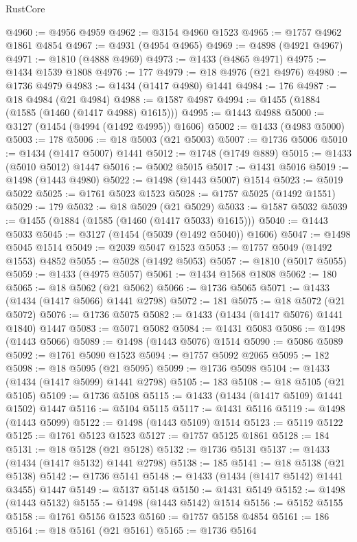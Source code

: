 \begin{lexlean}{RustCore}
\begin{coremodule}
@4960 := @4956 @4959
@4962 := @3154 @4960 @1523
@4965 := @1757 @4962 @1861 @4854
@4967 := @4931 (@4954 @4965)
@4969 := @4898 (@4921 @4967)
@4971 := @1810 (@4888 @4969)
@4973 := @1433 (@4865 @4971)
@4975 := @1434 @1539 @1808
@4976 := 177
@4979 := @18 @4976 (@21 @4976)
@4980 := @1736 @4979
@4983 := @1434 (@1417 @4980) @1441
@4984 := 176
@4987 := @18 @4984 (@21 @4984)
@4988 := @1587 @4987
@4994 := @1455 (@1884 (@1585 (@1460 (@1417 @4988) @1615)))
@4995 := @1443 @4988
@5000 := @3127 (@1454 (@4994 (@1492 @4995)) @1606)
@5002 := @1433 (@4983 @5000)
@5003 := 178
@5006 := @18 @5003 (@21 @5003)
@5007 := @1736 @5006
@5010 := @1434 (@1417 @5007) @1441
@5012 := @1748 (@1749 @889)
@5015 := @1433 (@5010 @5012) @1447
@5016 := @5002 @5015
@5017 := @1431 @5016
@5019 := @1498 (@1443 @4980)
@5022 := @1498 (@1443 @5007) @1514
@5023 := @5019 @5022
@5025 := @1761 @5023 @1523
@5028 := @1757 @5025 (@1492 @1551)
@5029 := 179
@5032 := @18 @5029 (@21 @5029)
@5033 := @1587 @5032
@5039 := @1455 (@1884 (@1585 (@1460 (@1417 @5033) @1615)))
@5040 := @1443 @5033
@5045 := @3127 (@1454 (@5039 (@1492 @5040)) @1606)
@5047 := @1498 @5045 @1514
@5049 := @2039 @5047 @1523
@5053 := @1757 @5049 (@1492 @1553) @4852
@5055 := @5028 (@1492 @5053)
@5057 := @1810 (@5017 @5055)
@5059 := @1433 (@4975 @5057)
@5061 := @1434 @1568 @1808
@5062 := 180
@5065 := @18 @5062 (@21 @5062)
@5066 := @1736 @5065
@5071 := @1433 (@1434 (@1417 @5066) @1441 @2798)
@5072 := 181
@5075 := @18 @5072 (@21 @5072)
@5076 := @1736 @5075
@5082 := @1433 (@1434 (@1417 @5076) @1441 @1840) @1447
@5083 := @5071 @5082
@5084 := @1431 @5083
@5086 := @1498 (@1443 @5066)
@5089 := @1498 (@1443 @5076) @1514
@5090 := @5086 @5089
@5092 := @1761 @5090 @1523
@5094 := @1757 @5092 @2065
@5095 := 182
@5098 := @18 @5095 (@21 @5095)
@5099 := @1736 @5098
@5104 := @1433 (@1434 (@1417 @5099) @1441 @2798)
@5105 := 183
@5108 := @18 @5105 (@21 @5105)
@5109 := @1736 @5108
@5115 := @1433 (@1434 (@1417 @5109) @1441 @1502) @1447
@5116 := @5104 @5115
@5117 := @1431 @5116
@5119 := @1498 (@1443 @5099)
@5122 := @1498 (@1443 @5109) @1514
@5123 := @5119 @5122
@5125 := @1761 @5123 @1523
@5127 := @1757 @5125 @1861
@5128 := 184
@5131 := @18 @5128 (@21 @5128)
@5132 := @1736 @5131
@5137 := @1433 (@1434 (@1417 @5132) @1441 @2798)
@5138 := 185
@5141 := @18 @5138 (@21 @5138)
@5142 := @1736 @5141
@5148 := @1433 (@1434 (@1417 @5142) @1441 @3455) @1447
@5149 := @5137 @5148
@5150 := @1431 @5149
@5152 := @1498 (@1443 @5132)
@5155 := @1498 (@1443 @5142) @1514
@5156 := @5152 @5155
@5158 := @1761 @5156 @1523
@5160 := @1757 @5158 @4854
@5161 := 186
@5164 := @18 @5161 (@21 @5161)
@5165 := @1736 @5164

\end{coremodule}
\end{lexlean}

